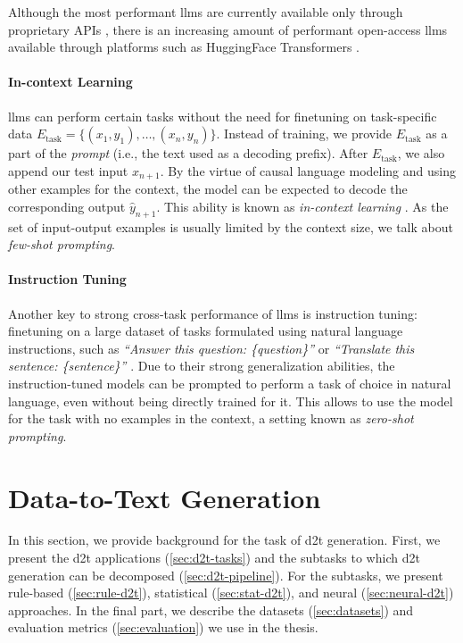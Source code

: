 {Although the most performant \acp{llm} are currently available only through proprietary APIs \cite{chatgpt,openai2023gpt4,team2023gemini,anthropic2024claude}, there is an increasing amount of performant open-access \acp{llm} \cite{jiangMistral7B2023,touvronLlamaOpenFoundation2023} available through platforms such as HuggingFace Transformers \cite{wolf2019HuggingFacesTS}.

\paragraph{In-context Learning} \acp{llm} can perform certain tasks without the need for finetuning on task-specific data $E_{\text{task}} = \{(x_1, y_1), \ldots, (x_n, y_n)\}$. Instead of training, we provide $E_{\text{task}}$ as a part of the \emph{prompt} (i.e., the text used as a decoding prefix). After $E_{\text{task}}$, we also append our test input $x_{n+1}$. By the virtue of causal language modeling and using other examples for the context, the model can be expected to decode the corresponding output $\hat{y}_{n+1}$. This ability is known as \emph{in-context learning} \cite{brown2020language,dong2022survey}. As the set of input-output examples is usually limited by the context size, we talk about \emph{few-shot prompting}.

\paragraph{Instruction Tuning} Another key to strong cross-task performance of \acp{llm} is instruction tuning: finetuning on a large dataset of tasks formulated using natural language instructions, such as \textit{``Answer this question: \{question\}''} or \textit{``Translate this sentence: \{sentence\}''} \cite{sanh2021multitask,ouyang2022TrainingLM}. Due to their strong generalization abilities, the instruction-tuned models can be prompted to perform a task of choice in natural language, even without being directly trained for it. This allows to use the model for the task with no examples in the context, a setting known as \emph{zero-shot prompting}.



\section{Data-to-Text Generation}
\label{sec:d2t}
In this section, we provide background for the task of \ac{d2t} generation. First, we present the \ac{d2t} applications (\autoref{sec:d2t-tasks}) and the subtasks to which \ac{d2t} generation can be decomposed (\autoref{sec:d2t-pipeline}). For the subtasks, we present rule-based (\autoref{sec:rule-d2t}), statistical (\autoref{sec:stat-d2t}), and neural (\autoref{sec:neural-d2t}) approaches. In the final part, we describe the datasets (\autoref{sec:datasets}) and evaluation metrics (\autoref{sec:evaluation}) we use in the thesis.

}
